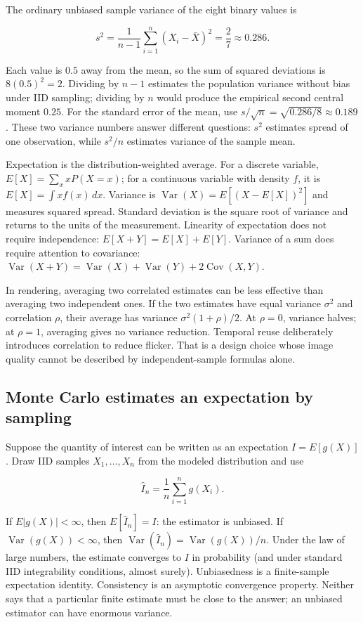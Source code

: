The ordinary unbiased sample variance of the eight binary values is

\[
s^2=\frac{1}{n-1}\sum_{i=1}^{n}(X_i-\bar X)^2
=\frac{2}{7}\approx0.286.
\]

Each value is \(0.5\) away from the mean, so the sum of squared deviations is \(8(0.5)^2=2\). Dividing by \(n-1\) estimates the population variance without bias under IID sampling; dividing by \(n\) would produce the empirical second central moment \(0.25\). For the standard error of the mean, use \(s/\sqrt n=\sqrt{0.286/8}\approx0.189\). These two variance numbers answer different questions: \(s^2\) estimates spread of one observation, while \(s^2/n\) estimates variance of the sample mean.

Expectation is the distribution-weighted average. For a discrete variable, \(E[X]=\sum_x xP(X=x)\); for a continuous variable with density \(f\), it is \(E[X]=\int xf(x)\,dx\). Variance is \(\operatorname{Var}(X)=E[(X-E[X])^2]\) and measures squared spread. Standard deviation is the square root of variance and returns to the units of the measurement. Linearity of expectation does not require independence: \(E[X+Y]=E[X]+E[Y]\). Variance of a sum does require attention to covariance: \(\operatorname{Var}(X+Y)=\operatorname{Var}(X)+\operatorname{Var}(Y)+2\operatorname{Cov}(X,Y)\).

In rendering, averaging two correlated estimates can be less effective than averaging two independent ones. If the two estimates have equal variance \(\sigma^2\) and correlation \(\rho\), their average has variance \(\sigma^2(1+\rho)/2\). At \(\rho=0\), variance halves; at \(\rho=1\), averaging gives no variance reduction. Temporal reuse deliberately introduces correlation to reduce flicker. That is a design choice whose image quality cannot be described by independent-sample formulas alone.

\subsection{Monte Carlo estimates an expectation by sampling}\label{03-visual-computing-i-ch012-monte-carlo-estimates-an-expectation-by-sampling}

Suppose the quantity of interest can be written as an expectation \(I=E[g(X)]\). Draw IID samples \(X_1,\ldots,X_n\) from the modeled distribution and use

\[
\hat I_n=\frac{1}{n}\sum_{i=1}^n g(X_i).
\]

If \(E|g(X)|<\infty\), then \(E[\hat I_n]=I\): the estimator is unbiased. If \(\operatorname{Var}(g(X))<\infty\), then \(\operatorname{Var}(\hat I_n)=\operatorname{Var}(g(X))/n\). Under the law of large numbers, the estimate converges to \(I\) in probability (and under standard IID integrability conditions, almost surely). Unbiasedness is a finite-sample expectation identity. Consistency is an asymptotic convergence property. Neither says that a particular finite estimate must be close to the answer; an unbiased estimator can have enormous variance.

